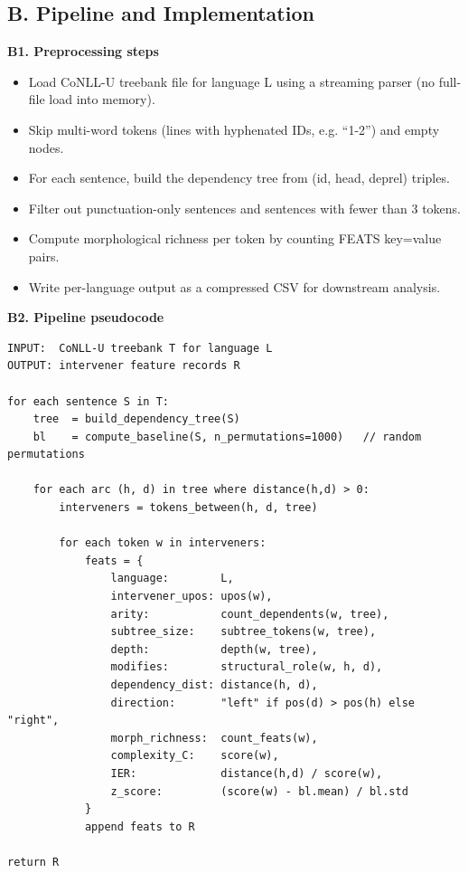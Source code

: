 \documentclass[11pt,a4paper]{article}
\begin{document}
\subsection*{B. Pipeline and Implementation}

\noindent\textbf{B1. Preprocessing steps}
\begin{itemize}[leftmargin=*, itemsep=1pt, parsep=0pt, topsep=2pt]
\item Load CoNLL-U treebank file for language L using a streaming parser (no full-file load into memory).
\item Skip multi-word tokens (lines with hyphenated IDs, e.g. ``1-2'') and empty nodes.
\item For each sentence, build the dependency tree from (id, head, deprel) triples.
\item Filter out punctuation-only sentences and sentences with fewer than 3 tokens.
\item Compute morphological richness per token by counting FEATS key=value pairs.
\item Write per-language output as a compressed CSV for downstream analysis.
\end{itemize}

\vspace{4pt}
\noindent\textbf{B2. Pipeline pseudocode}
\begin{small}
\begin{verbatim}
INPUT:  CoNLL-U treebank T for language L
OUTPUT: intervener feature records R

for each sentence S in T:
    tree  = build_dependency_tree(S)
    bl    = compute_baseline(S, n_permutations=1000)   // random permutations

    for each arc (h, d) in tree where distance(h,d) > 0:
        interveners = tokens_between(h, d, tree)

        for each token w in interveners:
            feats = {
                language:        L,
                intervener_upos: upos(w),
                arity:           count_dependents(w, tree),
                subtree_size:    subtree_tokens(w, tree),
                depth:           depth(w, tree),
                modifies:        structural_role(w, h, d),
                dependency_dist: distance(h, d),
                direction:       "left" if pos(d) > pos(h) else "right",
                morph_richness:  count_feats(w),
                complexity_C:    score(w),
                IER:             distance(h,d) / score(w),
                z_score:         (score(w) - bl.mean) / bl.std
            }
            append feats to R

return R
\end{verbatim}
\end{small}
\end{document}
